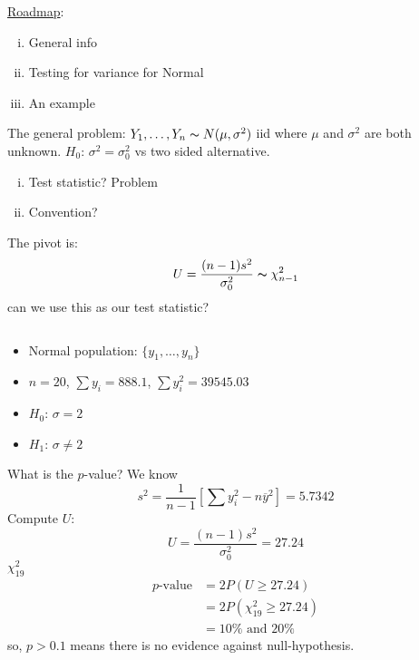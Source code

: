 \underline{Roadmap}:
\begin{enumerate}[(i)]
    \item General info
    \item Testing for variance for Normal
    \item An example
\end{enumerate}
The general problem: $ Y_1,\ldots ,Y_n \thicksim N(\mu,\sigma^2)$ iid
where $ \mu $ and $ \sigma^2 $ are both unknown.
$ H_0 $: $ \sigma^2=\sigma_0^2 $ vs two sided alternative.
\begin{enumerate}[(i)]
    \item Test statistic? Problem
    \item Convention?
\end{enumerate}
The pivot is:
\[ U=\frac{(n-1)s^2}{\sigma_0^2} \thicksim \chi^2_{n-1} \]
can we use this as our test statistic?

\begin{exbox}
    \begin{example} $ \; $
        \begin{itemize}
            \item Normal population: $ \{y_1,\ldots ,y_n\} $
            \item $ n=20 $, $ \sum y_i=888.1 $, $ \sum y_i^2=39545.03 $
            \item $ H_0 $: $ \sigma=2 $
            \item $ H_1 $: $ \sigma\neq 2 $
        \end{itemize}
        What is the $ p $-value?
        We know
        \[ s^2=\frac{1}{n-1} \left[ \sum y_i^2-n\overline{y}^2 \right]=5.7342 \]
        Compute $ U $:
        \[ U=\frac{(n-1)s^2}{\sigma_0^2}=27.24 \]
        $ \chi^2_{19} $
        \begin{align*}
            p\text{-value}
             & =2P(U\geqslant 27.24)           \\
             & =2P(\chi^2_{19}\geqslant 27.24) \\
             & =10\%\text{ and }20\%
        \end{align*}
        so, $ p>0.1 $ means there is no evidence against null-hypothesis.
    \end{example}
\end{exbox}

